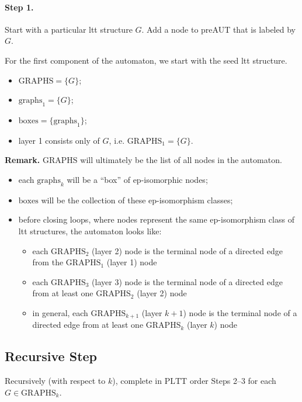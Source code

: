 \documentclass[11pt]{article}
\theoremstyle{definition}
\begin{document}
\paragraph{Step 1.}
Start with a particular ltt structure $G$. Add a node to preAUT that is labeled by $G$.

For the first component of the automaton, we start with the seed ltt structure.
\begin{itemize}
  \item $\mathrm{GRAPHS}=\{G\}$;
  \item $\mathrm{graphs}_1=\{G\}$;
  \item $\mathrm{boxes}=\{\mathrm{graphs}_1\}$;
  \item layer 1 consists only of $G$, i.e. $\mathrm{GRAPHS}_1=\{G\}$.
\end{itemize}


\medskip
\noindent\textbf{Remark.}
$\mathrm{GRAPHS}$ will ultimately be the list of all nodes in the automaton.
\begin{itemize}
  \item each $\mathrm{graphs}_k$ will be a ``box'' of ep-isomorphic nodes;
  \item $\mathrm{boxes}$ will be the collection of these ep-isomorphism classes;
  \item before closing loops, where nodes represent the same ep-isomorphism class of
        ltt structures, the automaton looks like:
{\begin{itemize}
  \item each $\mathrm{GRAPHS}_2$ (layer 2) node is the terminal node of a directed edge from the $\mathrm{GRAPHS}_1$ (layer 1) node
  \item each $\mathrm{GRAPHS}_3$ (layer 3) node is the terminal node of a directed edge from at least one $\mathrm{GRAPHS}_2$ (layer 2) node
  \item in general, each $\mathrm{GRAPHS}_{k+1}$ (layer $k+1$) node is the terminal node of a directed edge from at least one $\mathrm{GRAPHS}_k$ (layer $k$) node\\
\end{itemize}}
\end{itemize}

\subsection{Recursive Step}

Recursively (with respect to $k$), complete in $\mathrm{PLTT}$ order Steps 2--3
for each $G\in \mathrm{GRAPHS}_k$.
\end{document}
